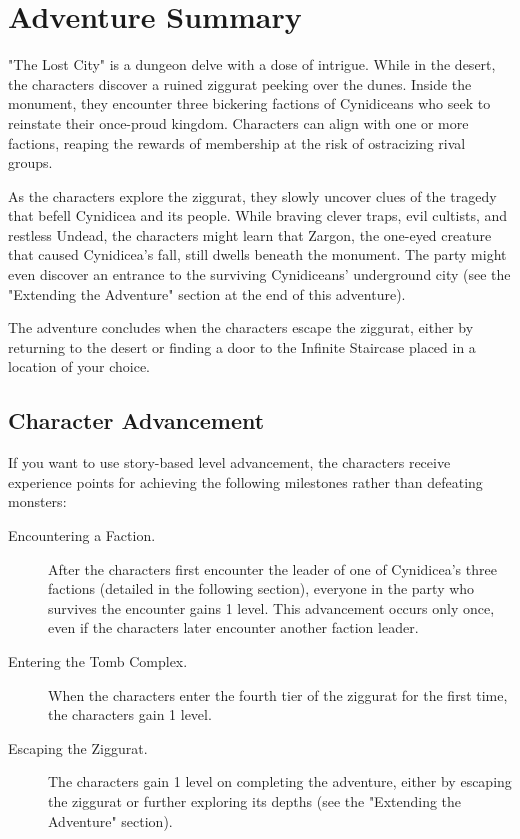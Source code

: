 \documentclass[10pt,a4paper,twoside,bg=print,twocolumn,openany,nodeprecatedcode]{dndbook}
\begin{document}
\section{Adventure Summary}
"The Lost City" is a dungeon delve with a dose of intrigue. While in the desert, the characters discover a ruined ziggurat peeking over the dunes. Inside the monument, they encounter three bickering factions of Cynidiceans who seek to reinstate their once-proud kingdom. Characters can align with one or more factions, reaping the rewards of membership at the risk of ostracizing rival groups.

As the characters explore the ziggurat, they slowly uncover clues of the tragedy that befell Cynidicea and its people. While braving clever traps, evil cultists, and restless Undead, the characters might learn that Zargon, the one-eyed creature that caused Cynidicea's fall, still dwells beneath the monument. The party might even discover an entrance to the surviving Cynidiceans' underground city (see the "Extending the Adventure" section at the end of this adventure).

The adventure concludes when the characters escape the ziggurat, either by returning to the desert or finding a door to the Infinite Staircase placed in a location of your choice.

\subsection{Character Advancement}
If you want to use story-based level advancement, the characters receive experience points for achieving the following milestones rather than defeating monsters:


\begin{description}
\item[Encountering a Faction.]
After the characters first encounter the leader of one of Cynidicea's three factions (detailed in the following section), everyone in the party who survives the encounter gains 1 level. This advancement occurs only once, even if the characters later encounter another faction leader.
\item[Entering the Tomb Complex.]
When the characters enter the fourth tier of the ziggurat for the first time, the characters gain 1 level.
\item[Escaping the Ziggurat.]
The characters gain 1 level on completing the adventure, either by escaping the ziggurat or further exploring its depths (see the "Extending the Adventure" section).
\end{description}
\end{document}
